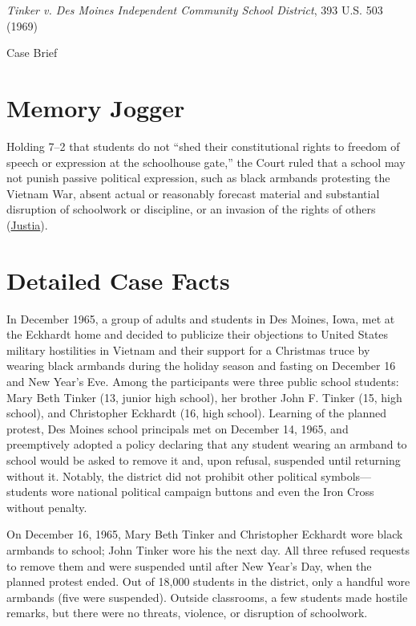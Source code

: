 \documentclass[12pt]{article}
\begin{document}
\begin{center}
{\LARGE \textit{Tinker v. Des Moines Independent Community School District}, 393 U.S. 503 (1969)\par}
\vspace{0.8em}
{\large Case Brief\par}
\end{center}
\vspace{1em}

\section{Memory Jogger}
Holding 7--2 that students do not ``shed their constitutional rights to freedom of speech or expression at the schoolhouse gate,'' the Court ruled that a school may not punish passive political expression, such as black armbands protesting the Vietnam War, absent actual or reasonably forecast material and substantial disruption of schoolwork or discipline, or an invasion of the rights of others (\href{https://supreme.justia.com/cases/federal/us/393/503/}{Justia}).

\section{Detailed Case Facts}
In December 1965, a group of adults and students in Des Moines, Iowa, met at the Eckhardt home and decided to publicize their objections to United States military hostilities in Vietnam and their support for a Christmas truce by wearing black armbands during the holiday season and fasting on December 16 and New Year's Eve. Among the participants were three public school students: Mary Beth Tinker (13, junior high school), her brother John F. Tinker (15, high school), and Christopher Eckhardt (16, high school). Learning of the planned protest, Des Moines school principals met on December 14, 1965, and preemptively adopted a policy declaring that any student wearing an armband to school would be asked to remove it and, upon refusal, suspended until returning without it. Notably, the district did not prohibit other political symbols---students wore national political campaign buttons and even the Iron Cross without penalty.

On December 16, 1965, Mary Beth Tinker and Christopher Eckhardt wore black armbands to school; John Tinker wore his the next day. All three refused requests to remove them and were suspended until after New Year's Day, when the planned protest ended. Out of 18,000 students in the district, only a handful wore armbands (five were suspended). Outside classrooms, a few students made hostile remarks, but there were no threats, violence, or disruption of schoolwork.
\end{document}
